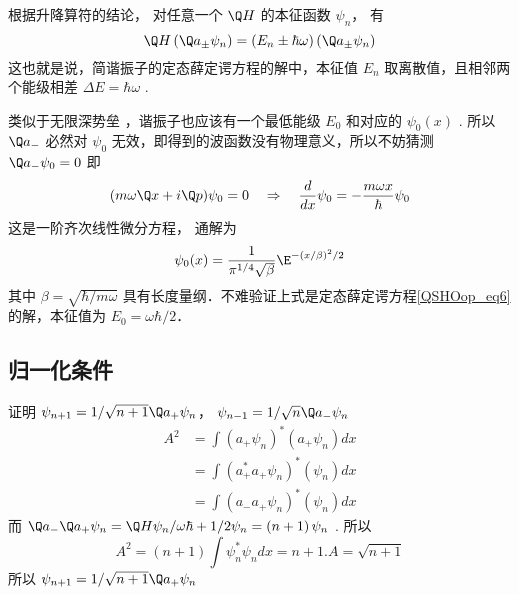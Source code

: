 根据升降算符的结论，%
对任意一个 $\Q H$ 的本征函数 ${\psi_n}$， 有
\begin{equation}
  \Q H\left( {{{\Q a}_ \pm }{\psi_n}} \right) = \left( {{E_n} \pm \hbar \omega } \right)\left( {{{\Q a}_ \pm }{\psi_n}} \right)
\end{equation}
这也就是说，简谐振子的定态薛定谔方程的解中，本征值 ${E_n}$ 取离散值，且相邻两个能级相差 $\Delta E = \hbar \omega $ . 

类似于无限深势垒%
，谐振子也应该有一个最低能级 ${E_0}$ 和对应的 ${\psi_0}\left( x \right)$ . 所以 ${\Q a_ - }$ 必然对 ${\psi_0}$ 无效，即得到的波函数没有物理意义，所以不妨猜测 ${\Q a_ - }{\psi_0} = 0$ 
即
\begin{equation}
(m\omega \Q x + i\Q p){\psi_0} = 0
\quad \Rightarrow \quad
\frac{d}{dx}{\psi_0} =  - \frac{m\omega x}{\hbar }{\psi_0}
\end{equation}
这是一阶齐次线性微分方程，%
通解为
\begin{equation}
{\psi_0}(x) = \frac{1}{{\pi ^{1/4}}\sqrt \beta  }{\E^{ - {{(x/\beta )}^2}/2}}
\end{equation}
其中 $\beta = \sqrt {\hbar /m\omega }$ 具有长度量纲．不难验证上式是定态薛定谔方程\autoref{QSHOop_eq6} 的解，本征值为 $E_0=\omega\hbar/2$．


\subsection{归一化条件}


证明 ${\psi_{n + 1}} = {1}/{\sqrt {n + 1} }{\Q a_ + }{\psi_n}$，  ${\psi_{n - 1}} = {1}/{\sqrt n }{\Q a_ - }{\psi_n}$ 
\begin{equation}
\begin{aligned}
  {A^2} & = \int {{{\left( {{a_ + }{\psi_n}} \right)}^*}\left( {{a_ + }{\psi_n}} \right)dx} \\
   & = \int {{{\left( {a_ + ^*{a_ + }{\psi_n}} \right)}^*}\left( {\psi_n} \right)dx}  \\
   & = \int {{{\left( {{a_ - }{a_ + }{\psi_n}} \right)}^*}\left( {\psi_n} \right)dx}
\end{aligned}
\end{equation}
而 ${\Q a_ - }{\Q a_ + }{\psi_n} = {\Q H{\psi_n}}/{\omega \hbar } + {1}/{2}{\psi_n} = \left( {n + 1} \right){\psi_n}$ . 所以
\begin{equation}
  {A^2} = \left( {n + 1} \right)\int {\psi_n^*{\psi_n}dx}  = n + 1. A = \sqrt {n + 1}
\end{equation}
所以 ${\psi_{n + 1}} = {1}/{\sqrt {n + 1} }{\Q a_ + }{\psi_n}$

